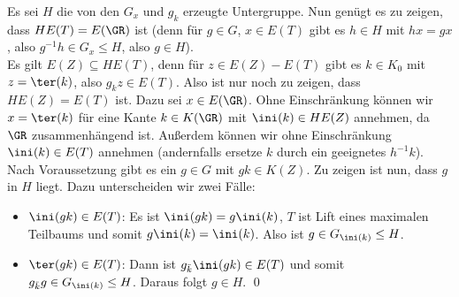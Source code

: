 \bew Es sei $H$ die von den $G_x$ und $g_k$ erzeugte Untergruppe.
Nun genügt es zu zeigen, dass $H E(T)=E(\GR)$ ist (denn für $g\in G$,
$x\in E(T)$ gibt es $h\in H$ mit $hx=gx$, also
$g^{-1}h\in G_x \leq H$, also $g\in H$).\\
Es gilt $E(Z)\subseteq H E(T)$, denn für $z\in E(Z)-E(T)$ gibt es
$k\in K_0$ mit $z=\ter(k)$, also $g_k z \in E(T)$.
Also ist nur noch zu zeigen, dass $HE(Z)=E(T)$ ist.
Dazu sei $x\in E(\GR)$. Ohne Einschränkung können wir $x=\ter(k)$
für eine Kante $k\in K(\GR)$ mit $\ini(k)\in HE(Z)$ annehmen,
da $\GR$ zusammenhängend ist. Außerdem können wir ohne Einschränkung
$\ini(k)\in E(T)$ annehmen (andernfalls ersetze $k$ durch ein
geeignetes $h^{-1}k$).
Nach Voraussetzung gibt es ein $g\in G$ mit $gk\in K(Z)$.
Zu zeigen ist nun, dass $g$ in $H$ liegt. Dazu unterscheiden wir
zwei Fälle:
\begin{itemize}
\item
$\ini(gk)\in E(T)$: Es ist $\ini(gk)=g\ini(k)$, $T$ ist Lift eines
maximalen Teilbaums und somit $g\ini(k)=\ini(k)$.
Also ist $g\in G_{\ini(k)}\leq H$.\\
\item
$\ter(gk)\in E(T)$: Dann ist $g_{\bar{k}} \ini(gk)\in E(T)$
und somit $g_{\bar{k}} g \in G_{\ini(k)}\leq H$.
Daraus folgt $g\in H$.
\qed
\end{itemize}